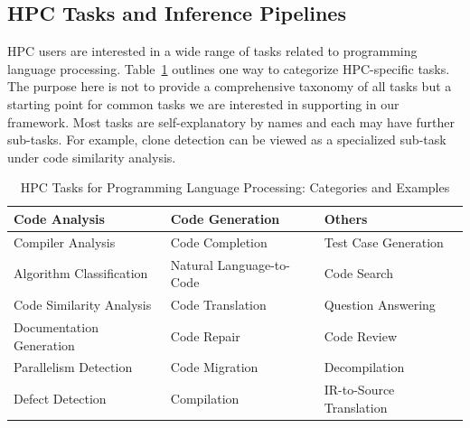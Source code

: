 \subsection{HPC Tasks and Inference Pipelines}
HPC users are interested in a wide range of tasks related to programming language processing. Table~\ref{tab-HPC-tasks} outlines one way to categorize HPC-specific tasks. The purpose here is not to provide a comprehensive taxonomy of all tasks but a starting point for common tasks we are interested in supporting in our framework. Most tasks are self-explanatory by names and each may have further sub-tasks. For example, clone detection can be viewed as a specialized sub-task under code similarity analysis. 
\begin{table}[htbp]
\centering
\caption{HPC Tasks for Programming Language Processing: Categories and Examples}
\label{tab-HPC-tasks}
\begin{tabular}{l|l|l}
\hline
\textbf{Code Analysis} & \textbf{Code Generation} & \textbf{Others} \\ \hline
Compiler Analysis & Code Completion & Test Case Generation \\
Algorithm Classification & Natural Language-to-Code & Code Search \\
Code Similarity Analysis & Code Translation & Question Answering \\
Documentation Generation & Code Repair & Code Review \\
Parallelism Detection & Code Migration & Decompilation  \\
Defect Detection & Compilation &  IR-to-Source Translation \\ \hline
\end{tabular}
\end{table}

